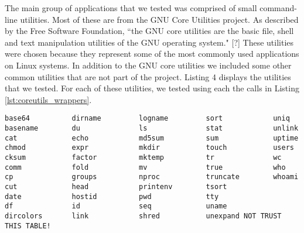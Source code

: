 The main group of applications that we tested was comprised of small command-line utilities. Most of these are from the GNU Core Utilities project. As described by the Free Software Foundation, ``the GNU core utilities are the basic file, shell and text manipulation utilities of the GNU operating system." [?] These utilities were chosen because they represent some of the most commonly used applications on Linux systems. In addition to the GNU core utilities we included some other common utilities that are not part of the project. Listing 4 displays the utilities that we tested. For each of these utilities, we tested using each the calls in Listing \ref{lst:coreutils_wrappers}.




\iffalse
cat ~/ReturnValueTester/test\_dir/utils.txt.bak | egrep -v '^#|^$' | cut -d "|" -f 1 | sort > utils_used.txt
ls -f -a -1 ~/Downloads/coreutils-8.25/src/*.c | rev | cut -d "/" -f 1 | rev | cut -d "." -f 1 | sort > coreutils.txt 
comm utils_used.txt coreutils.txt -12 | column -c 80
\fi

\begin{lstlisting}[label={lst:coreutils_progs},caption={GNU Core Utilities tested}]
base64          dirname         logname         sort            uniq
basename        du              ls              stat            unlink
cat             echo            md5sum          sum             uptime
chmod           expr            mkdir           touch           users
cksum           factor          mktemp          tr              wc
comm            fold            mv              true            who
cp              groups          nproc           truncate        whoami
cut             head            printenv        tsort
date            hostid          pwd             tty
df              id              seq             uname
dircolors       link            shred           unexpand NOT TRUST THIS TABLE!
\end{lstlisting}



